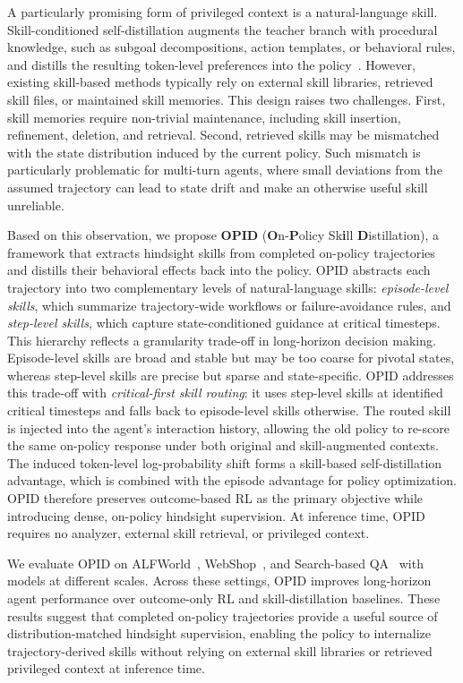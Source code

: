 \documentclass{llmxive}
\begin{document}
A particularly promising form of privileged context is a natural-language skill. Skill-conditioned self-distillation augments the teacher branch with procedural knowledge, such as subgoal decompositions, action templates, or behavioral rules, and distills the resulting token-level preferences into the policy~\citep{lu2026skill0,wang2026skillsd,lu2026sdar}. However, existing skill-based methods typically rely on external skill libraries, retrieved skill files, or maintained skill memories. This design raises two challenges. First, skill memories require non-trivial maintenance, including skill insertion, refinement, deletion, and retrieval. Second, retrieved skills may be mismatched with the state distribution induced by the current policy. Such mismatch is particularly problematic for multi-turn agents, where small deviations from the assumed trajectory can lead to state drift and make an otherwise useful skill unreliable.

Based on this observation, we propose \textbf{OPID} (\textbf{O}n-\textbf{P}olicy Sk\textbf{i}ll \textbf{D}istillation), a framework that extracts hindsight skills from completed on-policy trajectories and distills their behavioral effects back into the policy. OPID abstracts each trajectory into two complementary levels of natural-language skills: \emph{episode-level skills}, which summarize trajectory-wide workflows or failure-avoidance rules, and \emph{step-level skills}, which capture state-conditioned guidance at critical timesteps. This hierarchy reflects a granularity trade-off in long-horizon decision making. Episode-level skills are broad and stable but may be too coarse for pivotal states, whereas step-level skills are precise but sparse and state-specific. OPID addresses this trade-off with \emph{critical-first skill routing}: it uses step-level skills at identified critical timesteps and falls back to episode-level skills otherwise. The routed skill is injected into the agent's interaction history, allowing the old policy to re-score the same on-policy response under both original and skill-augmented contexts. The induced token-level log-probability shift forms a skill-based self-distillation advantage, which is combined with the episode advantage for policy optimization. OPID therefore preserves outcome-based RL as the primary objective while introducing dense, on-policy hindsight supervision. At inference time, OPID requires no analyzer, external skill retrieval, or privileged context.

We evaluate OPID on ALFWorld~\citep{shridhar2020alfworld}, 
WebShop~\citep{yao2022webshop}, and Search-based QA~\citep{jin2025searchr1} with models at different scales. Across these settings, OPID improves long-horizon agent performance over outcome-only RL and skill-distillation baselines. These results suggest that completed on-policy trajectories provide a useful source of distribution-matched hindsight supervision, enabling the policy to internalize trajectory-derived skills without relying on external skill libraries or retrieved privileged context at inference time.
\end{document}
